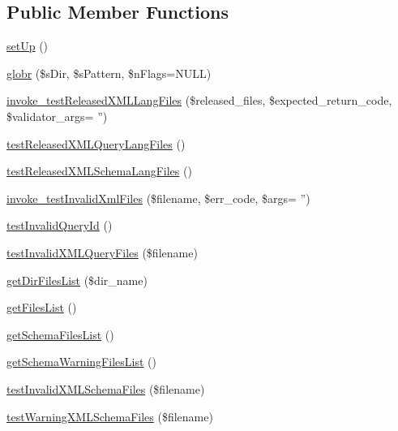 \subsection*{Public Member Functions}
\begin{DoxyCompactItemize}
\item 
\hyperlink{classXmlQueriesTest_ae1b1995ecd45742c8cb32e79bb20f4e1}{set\+Up} ()
\item 
\hyperlink{classXmlQueriesTest_a9cc223f0ba44eae73a955ab880a9957f}{globr} (\$s\+Dir, \$s\+Pattern, \$n\+Flags=N\+U\+L\+L)
\item 
\hyperlink{classXmlQueriesTest_a46345ba00dcdb3eba2157b6b20119946}{invoke\+\_\+test\+Released\+X\+M\+L\+Lang\+Files} (\$released\+\_\+files, \$expected\+\_\+return\+\_\+code, \$validator\+\_\+args= '')
\item 
\hyperlink{classXmlQueriesTest_adeb4d65750c74644286892c25d80c473}{test\+Released\+X\+M\+L\+Query\+Lang\+Files} ()
\item 
\hyperlink{classXmlQueriesTest_a50e0818a26ebb03ad70d661a53484bc5}{test\+Released\+X\+M\+L\+Schema\+Lang\+Files} ()
\item 
\hyperlink{classXmlQueriesTest_a8ee699b7c3972697b615e0383cf16032}{invoke\+\_\+test\+Invalid\+Xml\+Files} (\$filename, \$err\+\_\+code, \$args= '')
\item 
\hyperlink{classXmlQueriesTest_ae734e8d573f118b715dd3cd1ef10b893}{test\+Invalid\+Query\+Id} ()
\item 
\hyperlink{classXmlQueriesTest_a761682fe17ab17fb91f578a105fa0422}{test\+Invalid\+X\+M\+L\+Query\+Files} (\$filename)
\item 
\hyperlink{classXmlQueriesTest_a451e67785ee638ca9ded473b110d0d0b}{get\+Dir\+Files\+List} (\$dir\+\_\+name)
\item 
\hyperlink{classXmlQueriesTest_a376330e829a3d4a73f56d960846c83f3}{get\+Files\+List} ()
\item 
\hyperlink{classXmlQueriesTest_a2884b233d22edeecd1bd527c10130c45}{get\+Schema\+Files\+List} ()
\item 
\hyperlink{classXmlQueriesTest_a6b06887a37d0500e9d7c6191d4f511fd}{get\+Schema\+Warning\+Files\+List} ()
\item 
\hyperlink{classXmlQueriesTest_aa4bb785079dd4650d2c9d2594605a18f}{test\+Invalid\+X\+M\+L\+Schema\+Files} (\$filename)
\item 
\hyperlink{classXmlQueriesTest_a86be39a4284f0bf3cd71051162eba5b8}{test\+Warning\+X\+M\+L\+Schema\+Files} (\$filename)
\end{DoxyCompactItemize}

